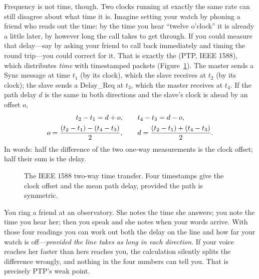 Frequency is not time, though. Two clocks running at exactly the same rate can still disagree
about what time it is. Imagine setting your watch by phoning a friend who reads out the time: by
the time you hear ``twelve o'clock'' it is already a little later, by however long the call takes to
get through. If you could measure that delay---say by asking your friend to call back immediately
and timing the round trip---you could correct for it. That is exactly the  (PTP, IEEE 1588), which distributes \emph{time} with timestamped packets
(Figure~\ref{fig:ch10_ptp}). The master sends a Sync message at time $t_1$ (by its clock), which the
slave receives at $t_2$ (by its clock); the slave sends a Delay\_Req at $t_3$, which the master
receives at $t_4$. If the path delay $d$ is the same in both directions and the slave's clock is
ahead by an offset $o$,
\begin{gather}
t_2-t_1=d+o,\qquad t_4-t_3=d-o, \notag\\
o=\frac{(t_2-t_1)-(t_4-t_3)}{2},\qquad d=\frac{(t_2-t_1)+(t_4-t_3)}{2}.
\label{eq:ch10:ptp}
\end{gather}
In words: half the difference of the two one-way measurements is the clock offset; half their sum
is the delay.

\begin{figure}[htbp]\centering
{}
\caption{The IEEE 1588 two-way time transfer. Four timestamps give the clock offset and the mean
path delay, provided the path is symmetric.}
\label{fig:ch10_ptp}
\end{figure}

\begin{analogy}
You ring a friend at an observatory. She notes the time she answers; you note the time you hear
her; then you speak and she notes when your words arrive. With those four readings you can work
out both the delay on the line and how far your watch is off---\emph{provided the line takes as
long in each direction}. If your voice reaches her faster than hers reaches you, the calculation
silently splits the difference wrongly, and nothing in the four numbers can tell you. That is
precisely PTP's weak point.
\end{analogy}


